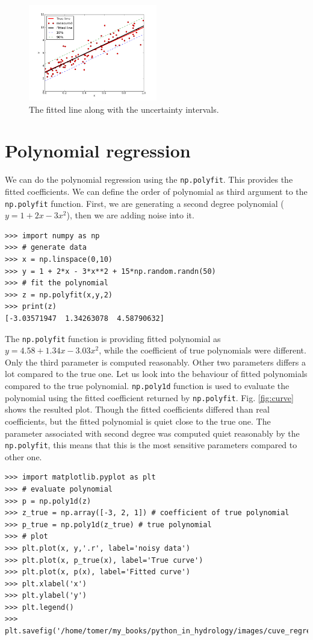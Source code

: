 \documentclass[10pt]{book}
\begin{document}
{\beforefig
\begin{figure}[h!]
  \centering
    \includegraphics[width=0.5\textwidth]{images/lin_regress.png}
  \caption{The fitted line along with the uncertainty intervals.}
   \label{fig:line}
\end{figure}
\afterfig

\section{Polynomial regression}
We can do the polynomial regression using the \verb"np.polyfit". This provides the fitted coefficients. We can define the order of polynomial as third argument to the \verb"np.polyfit" function. First, we are generating a second degree polynomial ($y=1+2x-3x^2$),
then we are adding noise into it. 
\beforeverb \begin{verbatim}
>>> import numpy as np
>>> # generate data
>>> x = np.linspace(0,10)
>>> y = 1 + 2*x - 3*x**2 + 15*np.random.randn(50)
>>> # fit the polynomial
>>> z = np.polyfit(x,y,2)
>>> print(z)
[-3.03571947  1.34263078  4.58790632]
\end{verbatim} \afterverb
The \verb"np.polyfit" function is providing fitted polynomial as $y=4.58+1.34x-3.03x^2$, while the coefficient of true polynomials were different. Only the third parameter is computed reasonably. Other two parameters differs a lot compared to the true one. Let us look into the behaviour of fitted polynomials compared to the true polynomial. \verb"np.poly1d" function is used to evaluate the polynomial using the fitted coefficient returned by \verb"np.polyfit". Fig. \ref{fig:curve} shows the resulted plot. Though the fitted coefficients differed than real coefficients, but the fitted polynomial is quiet close to the true one. The parameter associated with second degree was computed quiet reasonably by the \verb"np.polyfit", this means that this is the most sensitive parameters compared to other one.

\beforeverb \begin{verbatim}
>>> import matplotlib.pyplot as plt
>>> # evaluate polynomial 
>>> p = np.poly1d(z)
>>> z_true = np.array([-3, 2, 1]) # coefficient of true polynomial
>>> p_true = np.poly1d(z_true) # true polynomial
>>> # plot
>>> plt.plot(x, y,'.r', label='noisy data')
>>> plt.plot(x, p_true(x), label='True curve')
>>> plt.plot(x, p(x), label='Fitted curve')
>>> plt.xlabel('x')
>>> plt.ylabel('y')
>>> plt.legend()
>>> plt.savefig('/home/tomer/my_books/python_in_hydrology/images/cuve_regre.png')
\end{verbatim} \afterverb

}
\end{document}
